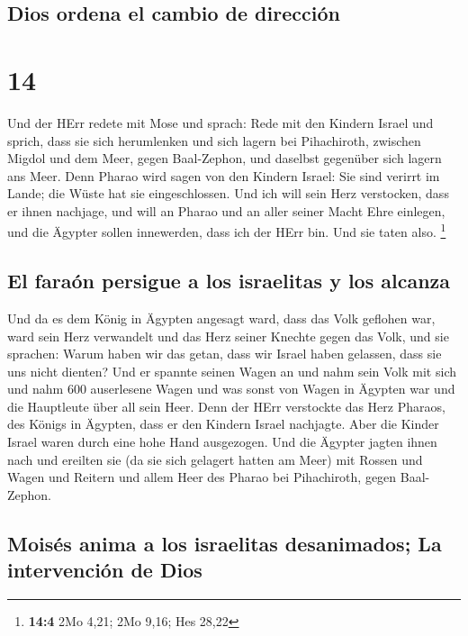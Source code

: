 \hypertarget{dios-ordena-el-cambio-de-direcciuxf3n}{%
\subsection{Dios ordena el cambio de
dirección}\label{dios-ordena-el-cambio-de-direcciuxf3n}}

\hypertarget{section-13}{%
\section{14}\label{section-13}}

 Und der HErr redete mit Mose und sprach: 
Rede mit den Kindern Israel und sprich, dass sie sich herumlenken und
sich lagern bei Pihachiroth, zwischen Migdol und dem Meer, gegen
Baal-Zephon, und daselbst gegenüber sich lagern ans Meer. 
Denn Pharao wird sagen von den Kindern Israel: Sie sind verirrt im
Lande; die Wüste hat sie eingeschlossen.  Und ich will
sein Herz verstocken, dass er ihnen nachjage, und will an Pharao und an
aller seiner Macht Ehre einlegen, und die Ägypter sollen innewerden,
dass ich der HErr bin. Und sie taten also. \footnote{\textbf{14:4} 2Mo
  4,21; 2Mo 9,16; Hes 28,22}

\hypertarget{el-farauxf3n-persigue-a-los-israelitas-y-los-alcanza}{%
\subsection{El faraón persigue a los israelitas y los
alcanza}\label{el-farauxf3n-persigue-a-los-israelitas-y-los-alcanza}}

 Und da es dem König in Ägypten angesagt ward, dass das
Volk geflohen war, ward sein Herz verwandelt und das Herz seiner Knechte
gegen das Volk, und sie sprachen: Warum haben wir das getan, dass wir
Israel haben gelassen, dass sie uns nicht dienten?  Und er
spannte seinen Wagen an und nahm sein Volk mit sich  und
nahm 600 auserlesene Wagen und was sonst von Wagen in Ägypten war und
die Hauptleute über all sein Heer.  Denn der HErr
verstockte das Herz Pharaos, des Königs in Ägypten, dass er den Kindern
Israel nachjagte. Aber die Kinder Israel waren durch eine hohe Hand
ausgezogen.  Und die Ägypter jagten ihnen nach und
ereilten sie (da sie sich gelagert hatten am Meer) mit Rossen und Wagen
und Reitern und allem Heer des Pharao bei Pihachiroth, gegen
Baal-Zephon.

\hypertarget{moisuxe9s-anima-a-los-israelitas-desanimados-la-intervenciuxf3n-de-dios}{%
\subsection{Moisés anima a los israelitas desanimados; La intervención
de
Dios}\label{moisuxe9s-anima-a-los-israelitas-desanimados-la-intervenciuxf3n-de-dios}}

